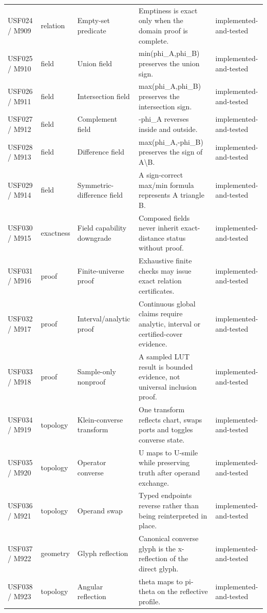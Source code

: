 \documentclass[11pt,a4paper]{article}
\begin{document}
\begin{longtable}{P{20mm}P{15mm}P{28mm}P{70mm}P{20mm}}
USF024 / M909 & relation & Empty-set predicate & Emptiness is exact only when the domain proof is complete. & implemented-and-tested \\
USF025 / M910 & field & Union field & min(phi\_A,phi\_B) preserves the union sign. & implemented-and-tested \\
USF026 / M911 & field & Intersection field & max(phi\_A,phi\_B) preserves the intersection sign. & implemented-and-tested \\
USF027 / M912 & field & Complement field & -phi\_A reverses inside and outside. & implemented-and-tested \\
USF028 / M913 & field & Difference field & max(phi\_A,-phi\_B) preserves the sign of A\textbackslash{}B. & implemented-and-tested \\
USF029 / M914 & field & Symmetric-difference field & A sign-correct max/min formula represents A triangle B. & implemented-and-tested \\
USF030 / M915 & exactness & Field capability downgrade & Composed fields never inherit exact-distance status without proof. & implemented-and-tested \\
USF031 / M916 & proof & Finite-universe proof & Exhaustive finite checks may issue exact relation certificates. & implemented-and-tested \\
USF032 / M917 & proof & Interval/analytic proof & Continuous global claims require analytic, interval or certified-cover evidence. & implemented-and-tested \\
USF033 / M918 & proof & Sample-only nonproof & A sampled LUT result is bounded evidence, not universal inclusion proof. & implemented-and-tested \\
USF034 / M919 & topology & Klein-converse transform & One transform reflects chart, swaps ports and toggles converse state. & implemented-and-tested \\
USF035 / M920 & topology & Operator converse & U maps to U-smile while preserving truth after operand exchange. & implemented-and-tested \\
USF036 / M921 & topology & Operand swap & Typed endpoints reverse rather than being reinterpreted in place. & implemented-and-tested \\
USF037 / M922 & geometry & Glyph reflection & Canonical converse glyph is the x-reflection of the direct glyph. & implemented-and-tested \\
USF038 / M923 & topology & Angular reflection & theta maps to pi-theta on the reflective profile. & implemented-and-tested \\

\end{longtable}
\end{document}
